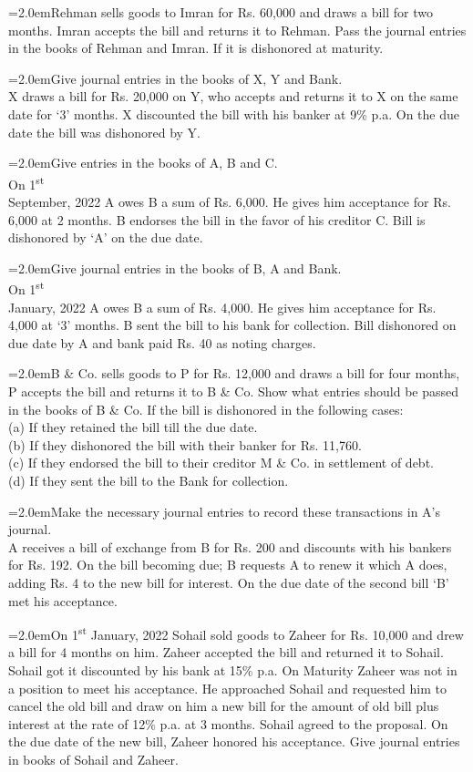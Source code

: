 \documentclass[11pt,a4paper]{article}
\newcommand{\lqn}[2]{\Needspace{6\baselineskip}\par\medskip\noindent\hangindent=2.0em\hangafter=1\makebox[2.0em][l]{\textbf{#1.}}#2\par}
\begin{document}
\lqn{34}{Rehman sells goods to Imran for Rs. 60,000 and draws a bill for two months. Imran accepts the bill and returns it to Rehman. Pass the journal entries in the books of Rehman and Imran. If it is dishonored at maturity.\par
}
\lqn{35}{Give journal entries in the books of X, Y and Bank.\\
X draws a bill for Rs. 20,000 on Y, who accepts and returns it to X on the same date for ‘3’ months. X discounted the bill with his banker at 9\% p.a. On the due date the bill was dishonored by Y.\par
}
\lqn{36}{Give entries in the books of A, B and C.\\
On 1\textsuperscript{st}\\
September, 2022 A owes B a sum of Rs. 6,000. He gives him acceptance for Rs. 6,000 at 2 months. B endorses the bill in the favor of his creditor C. Bill is dishonored by ‘A’ on the due date.\par
}
\lqn{37}{Give journal entries in the books of B, A and Bank.\\
On 1\textsuperscript{st}\\
January, 2022 A owes B a sum of Rs. 4,000. He gives him acceptance for Rs. 4,000 at ‘3’ months. B sent the bill to his bank for collection. Bill dishonored on due date by A and bank paid Rs. 40 as noting charges.\par
}
\lqn{38}{B \& Co. sells goods to P for Rs. 12,000 and draws a bill for four months, P accepts the bill and returns it to B \& Co. Show what entries should be passed in the books of B \& Co. If the bill is dishonored in the following cases:\\
(a) If they retained the bill till the due date.\\
(b) If they dishonored the bill with their banker for Rs. 11,760.\\
(c) If they endorsed the bill to their creditor M \& Co. in settlement of debt.\\
(d) If they sent the bill to the Bank for collection.\par
}
\lqn{39}{Make the necessary journal entries to record these transactions in A’s journal.\\
A receives a bill of exchange from B for Rs. 200 and discounts with his bankers for Rs. 192. On the bill becoming due; B requests A to renew it which A does, adding Rs. 4 to the new bill for interest. On the due date of the second bill ‘B’ met his acceptance.\par
}
\lqn{40}{On 1\textsuperscript{st}  January, 2022 Sohail sold goods to Zaheer for Rs. 10,000 and drew a bill for 4 months on him. Zaheer accepted the bill and returned it to Sohail. Sohail got it discounted by his bank at 15\% p.a. On Maturity Zaheer was not in a position to meet his acceptance. He approached Sohail and requested him to cancel the old bill and draw on him a new bill for the amount of old bill plus interest at the rate of 12\% p.a. at 3 months. Sohail agreed to the proposal. On the due date of the new bill, Zaheer honored his acceptance. Give journal entries in books of Sohail and Zaheer.\par
}
\end{document}
